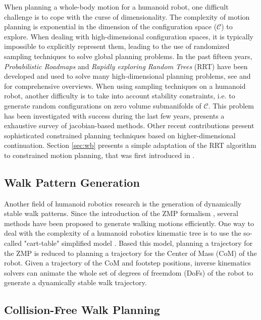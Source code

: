 \documentclass{article}
\begin{document}
When  planning a  whole-body motion  for a  humanoid robot, one difficult
challenge is to cope with  the curse of dimensionality. The complexity
of   motion  planning  is   exponential  in   the  dimension   of  the
configuration  space ($\mathcal{C}$)  to explore.  When  dealing with
high-dimensional configuration  spaces, it is  typically impossible to
explicitly represent  them, leading to the use  of randomized sampling
techniques  to solve  global planning  problems. In  the  past fifteen
years,  \textit{Probabilistic Roadmaps} \cite{kavraki1996prp} and  
\textit{Rapidly exploring Random  Trees} (RRT) 
\cite{kuffner00rrtconnect}  have been  developed and  used to  solve many
high-dimensional   planning  problems, see \cite{Lav06} and \cite{choset2005prm} for comprehensive
overviews.
When  using  sampling  techniques  on  a humanoid  robot,  another difficulty
is to  take into  account stability  constraints,  i.e. to
generate  random  configurations   on  zero  volume  submanifolds  of
$\mathcal{C}$. This problem has been investigated with success during
the last few years, \cite{Berenson15032011} presents a exhaustive survey
of jacobian-based methods. Other recent contributions \cite{porta2012randomized}
present sophisticated constrained planning techniques based on higher-dimensional
continuation. Section \ref{sec:wb} presents a simple adaptation
of the RRT algorithm to constrained motion planning, that was first
introduced in \cite{dalibard09}.

\subsection{Walk Pattern Generation}

Another  field of  humanoid  robotics research  is  the generation  of
dynamically stable  walk patterns. Since  the introduction of  the ZMP
formalism  \cite{vukobratovic1969contribution},  several  methods  have  been  proposed  to
generate  walking  motions efficiently.   One  way  to  deal with  the
complexity  of a  humanoid  robotics  kinematic tree  is  to use  the
so-called "cart-table" simplified model \cite{kajita2003biped}. Based this
model,  planning a trajectory  for the  ZMP is  reduced to  planning a
trajectory  for  the Center  of  Mass (CoM)  of  the  robot.  Given  a
trajectory  of  the CoM  and  footstep  positions, inverse  kinematics
solvers can animate  the whole set of degrees of freemdom (DoFs) of the  
robot to generate a dynamically stable walk trajectory.


\subsection{Collision-Free Walk Planning}
\end{document}
